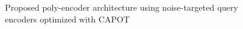 \label{app:poly-encoder}
\begin{figure}[htb!]
    \centering
    \caption{Proposed poly-encoder architecture using noise-targeted query encoders optimized with CAPOT}
    \label{fig:fig2}
\end{figure}